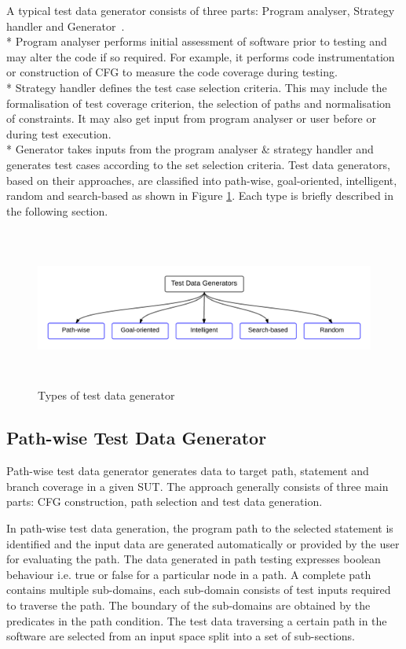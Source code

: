 A typical test data generator consists of three parts: Program analyser, Strategy handler and Generator~\cite{edvardsson1999survey}. \\*
Program analyser performs initial assessment of software prior to testing and may alter the code if so required. For example, it performs code instrumentation or construction of CFG to measure the code coverage during testing.\\* 
Strategy handler defines the test case selection criteria. This may include the formalisation of test coverage criterion, the selection of paths and normalisation of constraints. It may also get input from program analyser or user before or during test execution.\\*
Generator takes inputs from the program analyser \& strategy handler and generates test cases according to the set selection criteria. Test data generators, based on their approaches, are classified into path-wise, goal-oriented, intelligent, random and search-based as shown in Figure \ref{testDataGenerators_2}. Each type is briefly described in the following section.
\begin{figure}[h]
	\centering
	\centerline{\includegraphics[width=16.5cm, height=5.2cm ]{chapter2/Generators.png}}
	\caption{Types of test data generator}
	\label{testDataGenerators_2}
\end{figure}

\subsection{Path-wise Test Data Generator} 
\label{sec:pathwise_2}
Path-wise test data generator generates data to target path, statement and branch coverage in a given SUT. The approach generally consists of three main parts: CFG construction, path selection and test data generation. 

In path-wise test data generation, the program path to the selected statement is identified and the input data are generated automatically or provided by the user for evaluating the path. The data generated in path testing expresses boolean behaviour i.e. true or false for a particular node in a path. A complete path contains multiple sub-domains, each sub-domain consists of test inputs required to traverse the path. The boundary of the sub-domains are obtained by the predicates in the path condition. The test data traversing a certain path in the software are selected from an input space split into a set of sub-sections. 

